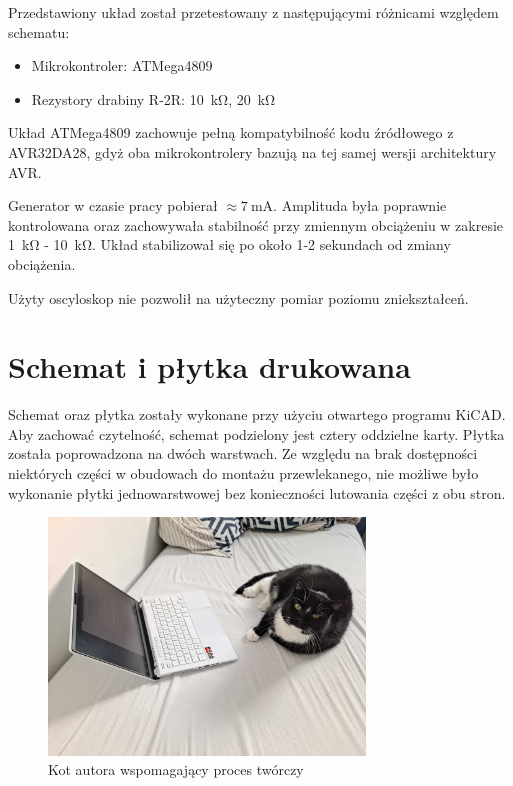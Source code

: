 \documentclass[12pt, a4paper]{article}
\begin{document}
Przedstawiony układ został przetestowany z następującymi różnicami względem schematu:

\begin{itemize}
	\item Mikrokontroler: ATMega4809
	\item Rezystory drabiny R-2R: \qty{10}{\kohm}, \qty{20}{\kohm}
\end{itemize}

Układ ATMega4809 zachowuje pełną kompatybilność kodu źródłowego z AVR32DA28,
gdyż oba mikrokontrolery bazują na tej samej wersji architektury AVR.

Generator w czasie pracy pobierał $\approx \qty{7}{\mA}$. Amplituda była poprawnie
kontrolowana oraz zachowywała stabilność przy zmiennym obciążeniu w zakresie \qty{1}{\kohm} - \qty{10}{\kohm}.
Układ stabilizował się po około 1-2 sekundach od zmiany obciążenia.

Użyty oscyloskop nie pozwolił na użyteczny pomiar poziomu zniekształceń. 

\section{Schemat i płytka drukowana}

Schemat oraz płytka zostały wykonane przy użyciu otwartego programu KiCAD.
Aby zachować czytelność, schemat podzielony jest cztery oddzielne karty.
Płytka została poprowadzona na dwóch warstwach. Ze względu na brak dostępności niektórych części w obudowach
do montażu przewlekanego, nie możliwe było wykonanie płytki jednowarstwowej bez konieczności lutowania części z obu stron.

\newpage
\printbibliography[title=Źródła] %

\newpage

\begin{figure}
	\centering
	\includegraphics[width=0.75\textwidth]{img/kot_enter.jpg}
	\caption{Kot autora wspomagający proces twórczy}
\end{figure}
\end{document}
